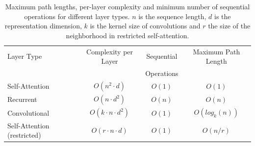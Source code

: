 \documentclass{article}
\begin{document}

\begin{table}[t]
\caption{
  Maximum path lengths, per-layer complexity and minimum number of sequential operations for different layer types. $n$ is the sequence length, $d$ is the representation dimension, $k$ is the kernel size of convolutions and $r$ the size of the neighborhood in restricted self-attention.}
\label{tab:op_complexities}
\begin{center}
\vspace{-1mm}

\begin{tabular}{lccc}
\toprule
Layer Type & Complexity per Layer & Sequential & Maximum Path Length  \\
           &             & Operations &   \\
\hline
\rule{0pt}{2.0ex}Self-Attention & $O(n^2 \cdot d)$ & $O(1)$ & $O(1)$ \\
Recurrent & $O(n \cdot d^2)$ & $O(n)$ & $O(n)$ \\

Convolutional & $O(k \cdot n \cdot d^2)$ & $O(1)$ & $O(log_k(n))$ \\
Self-Attention (restricted)& $O(r \cdot n \cdot d)$ & $O(1)$ & $O(n/r)$ \\





\bottomrule
\end{tabular}
\end{center}
\end{table}
\end{document}

